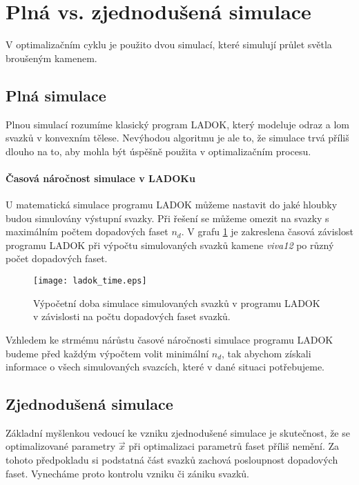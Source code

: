 \newpage

\section{Plná vs. zjednodušená simulace}
V optimalizačním cyklu je použito dvou simulací, které simulují průlet světla broušeným kamenem.

\subsection{Plná simulace}
Plnou simulací rozumíme klasický program LADOK, který modeluje odraz a lom svazků v konvexním tělese. Nevýhodou algoritmu je ale to, že simulace trvá příliš dlouho na to, aby mohla být úspěšně použita v optimalizačním procesu.

\paragraph{Časová náročnost simulace v LADOKu}
\hspace{1mm}

	U matematická simulace programu LADOK můžeme nastavit do jaké hloubky budou simulovány výstupní svazky. Při řešení se můžeme omezit na svazky s maximálním počtem dopadových faset $n_d$. V grafu \ref{fig: ladok_time} je zakreslena časová závislost programu LADOK při výpočtu simulovaných svazků kamene \textit{viva12} po různý počet dopadových faset. 
	
	\begin{figure}[htbp]
    \centering\texttt{[image: ladok\_time.eps]}
     \caption[Časová náročnost simulace LADOK.]{Výpočetní doba simulace simulovaných svazků v programu LADOK v závislosti na počtu dopadových faset svazků.}
 \label{fig: ladok_time}
 \end{figure}

	
	Vzhledem ke strmému nárůstu časové náročnosti simulace programu LADOK budeme před každým výpočtem volit minimální $n_d$, tak abychom získali informace o všech simulovaných svazcích, které v dané situaci potřebujeme.      


\subsection{Zjednodušená simulace}
Základní myšlenkou vedoucí ke vzniku zjednodušené simulace je skutečnost, že se optimalizované parametry $\vec{x}$ při optimalizaci parametrů faset příliš nemění. Za tohoto předpokladu si podstatná část svazků zachová posloupnost dopadových faset. Vynecháme proto kontrolu vzniku či zániku svazků. 

